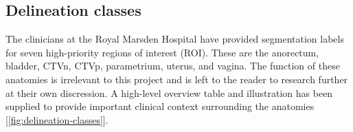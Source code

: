 \documentclass[11pt,twoside]{report}
\begin{document}


\subsection{Delineation classes}\label{sect:delineation-classes}

The clinicians at the Royal Marsden Hospital have provided segmentation labels for seven high-priority regions of interest (ROI). These are the anorectum, bladder, CTVn, CTVp, parametrium, uterus, and vagina. The function of these anatomies is irrelevant to this project and is left to the reader to research further at their own discression. A high-level overview table and illustration has been supplied to provide important clinical context surrounding the anatomies [\ref{fig:delineation-classes}].
\end{document}

